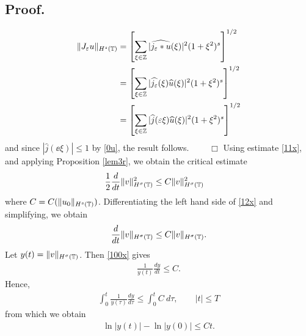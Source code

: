 \subsection{ Proof.}
\begin{equation*}
	\begin{split}
		\|J_\varepsilon u\|_{H^s(\mathbb{T})} 
		& = \left[\sum_{\xi \in \mathbb{Z}} |\widehat{j_\varepsilon * u}(\xi) |^2
		(1+\xi^2)^s \right ]^{1/2}
		\\
		& = \left [ \sum_{\xi \in \mathbb{Z}} |\widehat{j_\varepsilon} (\xi) \widehat{u}(\xi) |^2
		(1+ \xi^2)^s \right ]^{1/2}
		\\
		& = \left [ \sum_{\xi \in \mathbb{Z}} |\widehat{j}(\varepsilon \xi)
		\widehat{u}(\xi)|^2 ( 1+ \xi^2)^s \right ]^{1/2}
	\end{split}
\end{equation*}
and since $|\widehat{j }(\ee \xi) | \le 1$ by \eqref{0u}, the result
follows. $\qquad \Box$
Using estimate \eqref{11x}, and applying Proposition \ref{lem3r}, 
we obtain the critical estimate 
\begin{equation}
	\begin{split}
		\label{12x}
		\frac{1}{2}\frac{d}{dt} \|v\|_{H^{\sigma}(\mathbb{T})}^2
		& \le
	 C \|v\|_{H^{\sigma}(\mathbb{T})}^2
\end{split}
\end{equation}
where $C = C(\|u_0\|_{H^s(\mathbb{T})})$. Differentiating the left hand side of
\eqref{12x} and simplifying, we obtain
\begin{equation}
	\begin{split}
		\frac{d}{dt}\|v\|_{H^{\sigma}(\mathbb{T})} \le C \|v\|_{H^{\sigma}(\mathbb{T})}.
		\label{100x}
	\end{split}
\end{equation}
Let $y(t) = \|v\|_{H^{\sigma}(\mathbb{T})}$. Then \eqref{100x} gives
\begin{equation*}
	\begin{split}
		\frac{1}{y(t)}\frac{dy}{dt} \le C.
	\end{split}
\end{equation*}
Hence,
\begin{equation*}
	\begin{split}
		\int_0^t \frac{1}{y(\tau)} \frac{dy}{d \tau}
		\le \int_0^t C \ d \tau, \qquad |t| \le T
	\end{split}
\end{equation*}
from which we obtain
\begin{equation}
	\begin{split}
		\ln |y(t) | - \ln |y(0)| \le C t.
		\label{101x}
	\end{split}
\end{equation}
